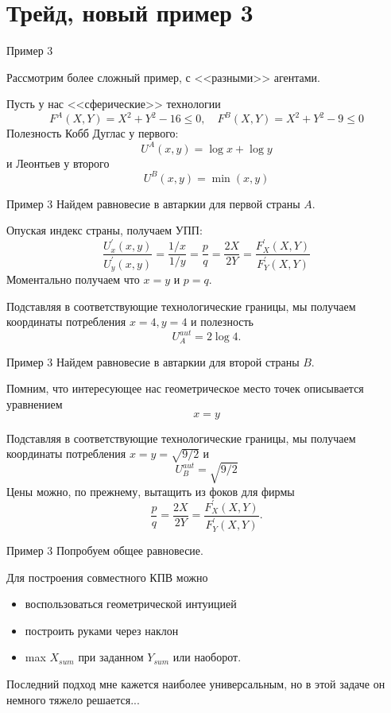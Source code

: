 \documentclass{beamer}
\begin{document}
\section{Трейд, новый пример 3}

\begin{frame}{Пример 3}

Рассмотрим более сложный пример, с <<разными>> агентами.

Пусть у нас <<сферические>> технологии
$$ F^A(X,Y) = X^2 + Y^2 - 16 \leqslant 0, \quad F^B(X,Y) = X^2 + Y^2 - 9 \leqslant 0$$
Полезность Кобб Дуглас у первого: $$U^A(x,y) = \log x + \log y$$
и Леонтьев у второго $$U^B(x,y) = \min(x, y)$$
\end{frame}

\begin{frame}{Пример 3}
Найдем равновесие в автаркии для первой страны $A$. 

Опуская индекс страны, получаем УПП:
$$ \frac{U^{'}_x(x,y)}{U^{'}_y(x,y)} = \frac{1/x}{1/y} = \frac{p}{q} = \frac{2X}{2Y} = \frac{F^{'}_X(X,Y)}{F^{'}_Y(X,Y)}$$
Моментально получаем что $x = y$ и $p = q$.

Подставляя в соответствующие технологические границы, мы получаем координаты потребления $x = 4, y = 4$ и полезность $$U^{aut}_A = 2 \log 4.$$

\end{frame}

\begin{frame}{Пример 3}
Найдем равновесие в автаркии для второй страны $B$. 

Помним, что интересующее нас геометрическое место точек описывается уравнением
$$x = y$$

Подставляя в соответствующие технологические границы, мы получаем координаты потребления $x = y = \sqrt{9/2}$ и $$U^{aut}_B = \sqrt{9/2}$$
Цены можно, по прежнему, вытащить из фоков для фирмы
$$ \frac{p}{q} = \frac{2X}{2Y} = \frac{F^{'}_X(X,Y)}{F^{'}_Y(X,Y)}.$$
\end{frame}

\begin{frame}{Пример 3}
Попробуем общее равновесие.

Для построения совместного КПВ можно
\begin{itemize}
  \item воспользоваться геометрической интуицией
  \item построить руками через наклон
  \item max $X_{sum}$ при заданном $Y_{sum}$ или наоборот.
\end{itemize}
Последний подход мне кажется наиболее универсальным, но в этой задаче он немного тяжело решается...\end{frame}
\end{document}
